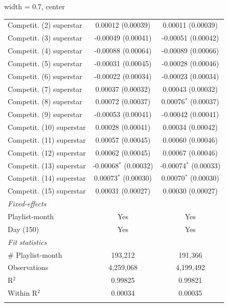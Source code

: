 \begin{table}[htbp]
\begin{adjustbox}{width = 0.7\textwidth, center}
\begin{threeparttable}[b]
\begin{tabular}{lcc}
            Competit. (2) superstar                & 0.00012 (0.00039)         & 0.00011 (0.00039)\\   
            Competit. (3) superstar                & -0.00049 (0.00041)        & -0.00051 (0.00042)\\   
            Competit. (4) superstar                & -0.00088 (0.00064)        & -0.00089 (0.00066)\\   
            Competit. (5) superstar                & -0.00031 (0.00045)        & -0.00028 (0.00046)\\   
            Competit. (6) superstar                & -0.00022 (0.00034)        & -0.00023 (0.00034)\\   
            Competit. (7) superstar                & 0.00037 (0.00032)         & 0.00043 (0.00032)\\   
            Competit. (8) superstar                & 0.00072 (0.00037)         & 0.00076$^{*}$ (0.00037)\\   
            Competit. (9) superstar                & -0.00053 (0.00041)        & -0.00042 (0.00041)\\   
            Competit. (10) superstar               & 0.00028 (0.00041)         & 0.00034 (0.00042)\\   
            Competit. (11) superstar               & 0.00057 (0.00045)         & 0.00060 (0.00046)\\   
            Competit. (12) superstar               & 0.00062 (0.00045)         & 0.00067 (0.00046)\\   
            Competit. (13) superstar               & -0.00068$^{*}$ (0.00032)  & -0.00074$^{*}$ (0.00033)\\   
            Competit. (14) superstar               & 0.00073$^{*}$ (0.00030)   & 0.00070$^{*}$ (0.00030)\\   
            Competit. (15) superstar               & 0.00031 (0.00027)         & 0.00030 (0.00027)\\   
            \midrule
            \emph{Fixed-effects}\\
            Playlist-month                         & Yes                       & Yes\\  
            Day (150)                              & Yes                       & Yes\\  
            \midrule
            \emph{Fit statistics}\\
            \# Playlist-month                      & 193,212                   & 191,366\\  
            Observations                           & 4,259,068                 & 4,199,492\\  
            R$^2$                                  & 0.99825                   & 0.99821\\  
            Within R$^2$                           & 0.00034                   & 0.00035\\  
            \midrule \midrule & \tabularnewline
         \end{tabular}
         

\end{threeparttable}
\end{adjustbox}
\end{table}
